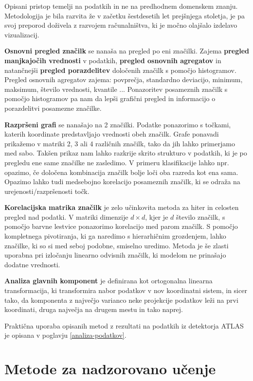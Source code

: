 \documentclass[11pt,a4paper,openany]{book}
\begin{document}
Opisani pristop temelji na podatkih in ne na predhodnem domenskem znanju. Metodologija je bila razvita že v začetku šestdesetih let prejšnjega stoletja, je pa svoj preporod doživela z razvojem računalništva, ki je močno olajšalo izdelavo vizualizacij. 

\textbf{Osnovni pregled značilk} se nanaša na pregled po eni značilki. Zajema \textbf{pregled manjkajočih vrednosti} v podatkih, \textbf{pregled osnovnih agregatov} in natančnejši \textbf{pregled porazdelitev} določenih značilk s pomočjo histogramov. Pregled osnovnih agregatov zajema: povprečja, standardno deviacijo, minimum, maksimum, število vrednosti, kvantile ... Ponazoritev posameznih značilk s pomočjo histogramov pa nam da lepši grafični pregled in informacijo o porazdelitvi posamezne značilke.

\textbf{Razpršeni grafi} se nanašajo na 2 značilki. Podatke ponazorimo s točkami, katerih koordinate predstavljajo vrednosti obeh značilk. Grafe ponavadi prikažemo v matriki 2, 3 ali 4 različnih značilk, tako da jih lahko primerjamo med sabo. Takšen prikaz nam lahko razkrije skrito strukturo v podatkih, ki je po pregledu ene same značilke ne zasledimo. V primeru klasifikacije lahko npr. opazimo, če določena kombinacija značilk bolje loči oba razreda kot ena sama. Opazimo lahko tudi medsebojno korelacijo posameznih značilk, ki se odraža na urejenosti/razpršenosti točk.

\textbf{Korelacijska matrika značilk} je zelo učinkovita metoda za hiter in celosten pregled nad podatki. V matriki dimenzije $d \times d$, kjer je $d$ število značilk, s pomočjo barvne lestvice ponazorimo korelacijo med parom značilk. S pomočjo kompletnega pivotiranja, ki ga naredimo s hierarhičnim grozdenjem, lahko značilke, ki so si med seboj podobne, smiselno uredimo. Metoda je še zlasti uporabna pri izločanju linearno odvisnih značilk, ki modelom ne prinašajo dodatne vrednosti. 

\textbf{Analiza glavnih komponent} je definirana kot ortogonalna linearna transformacija, ki transformira nabor podatkov v nov koordinatni sistem, in sicer tako, da komponenta z največjo varianco neke projekcije podatkov leži na prvi koordinati, druga največja na drugem mestu in tako naprej.

Praktična uporaba opisanih metod z rezultati na podatkih iz detektorja ATLAS je opisana v poglavju \ref{analiza-podatkov}.

\section{Metode za nadzorovano učenje}
\end{document}
